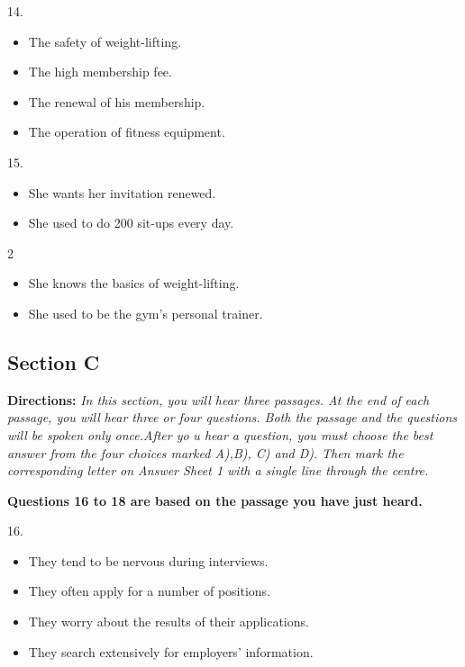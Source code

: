 \documentclass[UTF8,11pt]{ctexart}
\begin{document}
14.


\begin{itemize}[leftmargin=2em,itemsep=.2em,topsep=.4em]\item[A.] The safety of weight-lifting.
\item[B.] The high membership fee.
\item[C.] The renewal of his membership.
\item[D.] The operation of fitness equipment.
\end{itemize}

15.


\begin{itemize}[leftmargin=2em,itemsep=.2em,topsep=.4em]\item[A.] She wants her invitation renewed.
\item[B.] She used to do 200 sit-ups every day.
\end{itemize}

2


\begin{itemize}[leftmargin=2em,itemsep=.2em,topsep=.4em]\item[C.] She knows the basics of weight-lifting.
\item[D.] She used to be the gym's personal trainer.
\end{itemize}

\subsection*{\textbf{Section C}}


\textbf{Directions:}\textit{ In this section, you will hear three passages. At the end of each passage, you will} \textit{hear three or four questions. Both the passage and the questions will be spoken only once.After yo} \textit{u hear a question, you must choose the best answer from the four choices marked A),B), C) and D).} \textit{Then mark the corresponding letter on Answer Sheet 1 with a single line through the centre.}


\textbf{Questions 16 to 18 are based on the passage you have just heard.}


16.


\begin{itemize}[leftmargin=2em,itemsep=.2em,topsep=.4em]\item[A.] They tend to be nervous during interviews.
\item[B.] They often apply for a number of positions.
\item[C.] They worry about the results of their applications.
\item[D.] They search extensively for employers' information.
\end{itemize}
\end{document}
